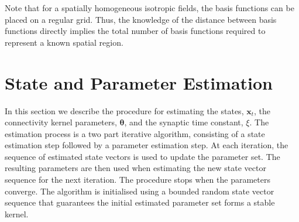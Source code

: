 \documentclass[10pt,a4paper]{article}
\begin{document}
Note that for a spatially homogeneous isotropic fields, the basis functions can be placed on a regular grid. Thus, the knowledge of the distance between basis functions directly implies the total number of basis functions required to represent a known spatial region.

% 
\section{State and Parameter Estimation}\label{StateAndParameterEstimationSection} In this section we describe the procedure for estimating the states, $\mathbf{x}_t$, the connectivity kernel parameters, $\boldsymbol \theta$, and the synaptic time constant, $\xi$. The estimation process is a two part iterative algorithm, consisting of a state estimation step followed by a parameter estimation step. At each iteration, the sequence of estimated state vectors is used to update the parameter set. The resulting parameters are then used when estimating the new state vector sequence for the next iteration. The procedure stops when the parameters converge. The algorithm is initialised using a bounded random state vector sequence that guarantees the initial estimated parameter set forms a stable kernel.
\end{document}
